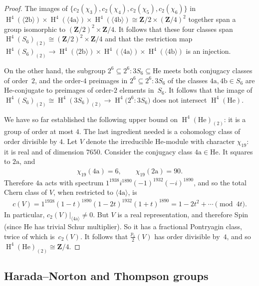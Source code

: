 \documentclass[pdftex]{sigma}
\numberwithin{equation}{section}
\newcommand\bZ{\mathbf Z}
\newcommand\ra{\mathrm a}
\newcommand\rb{\mathrm b}
\DeclareMathOperator\homology{H}
\renewcommand\H{\homology}
\newcommand\<\langle
\renewcommand\>\rangle
\begin{document}
\begin{proof}
 The images of $\{c_2(\chi_3), c_2(\chi_4), c_2(\chi_5), c_2(\chi_6)\}$ in $\H^4(\langle 2\rb\rangle) \times \H^4(\langle 4\ra\rangle) \times \H^4(\langle 4\rb\rangle) \cong \bZ/2 \times (\bZ/4)^2$ together span a group isomorphic to $(\bZ/2)^2 \times \bZ/4$. It follows that these four classes span $\H^4(S_6)_{(2)} \cong (\bZ/2)^2 \times \bZ/4$ and that the restriction map $\H^4(S_6)_{(2)} \to \H^4(\langle 2\rb\rangle) \times \H^4(\langle 4\ra\rangle) \times \H^4(\langle 4\rb\rangle)$ is an injection.

 On the other hand, the subgroup $2^6 \subseteq 2^6:3S_6 \subseteq \mathrm{He}$ meets both conjugacy classes of order~$2$, and the order-$4$ preimages in $2^6 \subseteq 2^6:3S_6$ of the classes $4\ra,4\rb \in S_6$ are $\mathrm{He}$-conjugate to preimages of order-$2$ elements in~$S_6$. It follows that the image of $\H^4(S_6)_{(2)} \cong \H^4(3S_6)_{(2)} \to \H^4\big(2^6:3S_6\big)$ does not intersect $\H^4(\mathrm{He})$.

 We have so far established the following upper bound on $\H^4(\mathrm{He})_{(2)}$: it is a group of order at most $4$.
 The last ingredient needed is a cohomology class of order divisible by $4$. Let $V$ denote the irreducible $\mathrm{He}$-module with character $\chi_{19}$: it is real and of dimension $7650$. Consider the conjugacy class $4\ra \in \mathrm{He}$. It squares to $2\ra$, and
 \begin{gather*} \chi_{19}(4\ra) = 6, \qquad \chi_{19}(2\ra) = 90. \end{gather*}
 Therefore $4\ra$ acts with spectrum $1^{1938} i^{1890} (-1)^{1932} (-i)^{1890}$, and so the total Chern class of $V$, when restricted to $\langle 4\ra\rangle$, is
 \begin{gather*} c(V) = 1^{1938} (1-t)^{1890} (1-2t)^{1932} (1+t)^{1890} = 1 - 2 t^2 + \cdots \pmod {4t}. \end{gather*}
 In particular, $c_2(V)|_{\langle 4\ra\rangle} \neq 0$. But $V$ is a real representation, and therefore Spin (since $\mathrm{He}$ has trivial Schur multiplier). So it has a fractional Pontryagin class, twice of which is~$c_2(V)$. It follows that $\frac{p_1}2(V)$ has order divisible by~$4$, and so $\H^4(\mathrm{He})_{(2)} \cong \bZ/4$.
\end{proof}

\subsection{Harada--Norton and Thompson groups}
\end{document}
